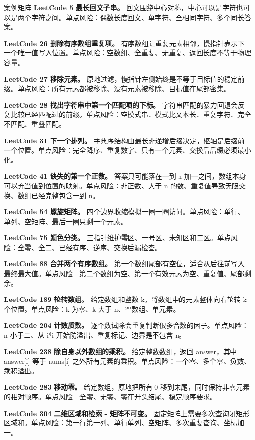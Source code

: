 \begin{principlebox}{案例矩阵}
\textbf{LeetCode 5 最长回文子串。}
回文围绕中心对称，中心可以是字符也可以是两个字符之间。单点风险：偶数长度回文、单字符、全相同字符、多个同长答案。

\textbf{LeetCode 26 删除有序数组重复项。}
有序数组让重复元素相邻，慢指针表示下一个唯一值写入位置。单点风险：空数组、全重复、无重复、返回长度不等于物理容量。

\textbf{LeetCode 27 移除元素。}
原地过滤，慢指针左侧始终是不等于目标值的稳定前缀。单点风险：所有元素都被移除、没有元素被移除、目标值在尾部密集。

\textbf{LeetCode 28 找出字符串中第一个匹配项的下标。}
字符串匹配的暴力回退会反复比较已经匹配过的前缀。单点风险：空模式串、模式比文本长、重复字符、完全不匹配、重叠匹配。

\textbf{LeetCode 31 下一个排列。}
字典序结构由最长非递增后缀决定，枢轴是后缀前一个位置。单点风险：完全降序、重复数字、只有一个元素、交换后后缀必须最小化。

\textbf{LeetCode 41 缺失的第一个正数。}
答案只可能落在一到 n 加一之间，数组本身可以充当值到位置的映射。单点风险：非正数、大于 n 的数、重复值导致无限交换、数组已经完整包含一到 n。

\textbf{LeetCode 54 螺旋矩阵。}
四个边界收缩模拟一圈一圈访问。单点风险：单行、单列、空矩阵、最后一圈只剩一个元素。

\textbf{LeetCode 75 颜色分类。}
三指针维护零区、一号区、未知区和二区。单点风险：全零、全二、已经有序、逆序、交换后漏检查。

\textbf{LeetCode 88 合并两个有序数组。}
第一个数组尾部有空位，适合从后往前写入最终最大值。单点风险：第二个数组为空、第一个有效元素为空、重复值、尾部剩余。

\textbf{LeetCode 189 轮转数组。}
给定数组和整数 k，将数组中的元素整体向右轮转 k 个位置。单点风险：k 为零、k 大于 n、空数组、单元素。

\textbf{LeetCode 204 计数质数。}
逐个数试除会重复判断很多合数的因子。单点风险：n 小于二、从 i*i 开始防溢出、重复标记、边界是不包含 n。

\textbf{LeetCode 238 除自身以外数组的乘积。}
给定整数数组，返回 answer，其中 answer[i] 等于 nums[i] 之外所有元素的乘积。单点风险：一个零、多个零、负数、乘积溢出。

\textbf{LeetCode 283 移动零。}
给定数组，原地把所有 0 移到末尾，同时保持非零元素的相对顺序。单点风险：全零、无零、零在开头结尾、稳定顺序要求。

\textbf{LeetCode 304 二维区域和检索 - 矩阵不可变。}
固定矩阵上需要多次查询闭矩形区域和。单点风险：第一行第一列、单行单列、空矩阵、多次重复查询、坐标加一。


\end{principlebox}
